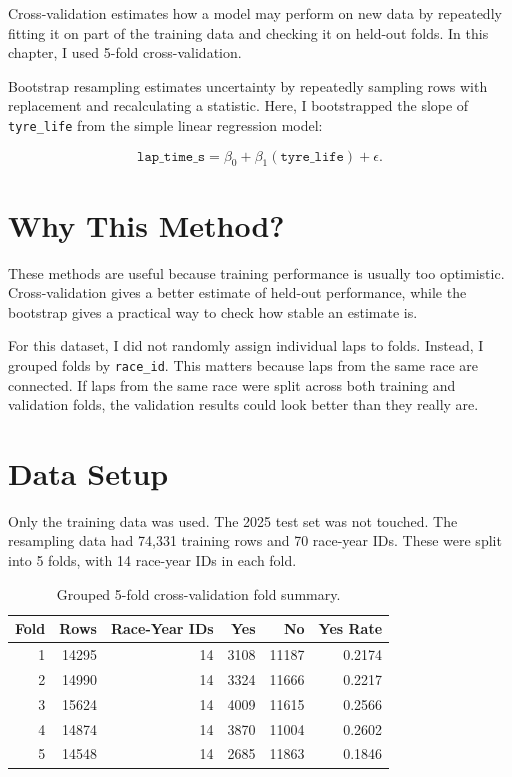 \documentclass[11pt,oneside,openany]{book}
\begin{document}
Cross-validation estimates how a model may perform on new data by repeatedly fitting it on part of the training data and checking it on held-out folds. In this chapter, I used 5-fold cross-validation.

Bootstrap resampling estimates uncertainty by repeatedly sampling rows with replacement and recalculating a statistic. Here, I bootstrapped the slope of \texttt{tyre\_life} from the simple linear regression model:

\[
\texttt{lap\_time\_s} = \beta_0 + \beta_1(\texttt{tyre\_life}) + \epsilon.
\]

\section{Why This Method?}

These methods are useful because training performance is usually too optimistic. Cross-validation gives a better estimate of held-out performance, while the bootstrap gives a practical way to check how stable an estimate is.

For this dataset, I did not randomly assign individual laps to folds. Instead, I grouped folds by \texttt{race\_id}. This matters because laps from the same race are connected. If laps from the same race were split across both training and validation folds, the validation results could look better than they really are.

\section{Data Setup}

Only the training data was used. The 2025 test set was not touched. The resampling data had 74,331 training rows and 70 race-year IDs. These were split into 5 folds, with 14 race-year IDs in each fold.

\begin{table}[H]
\centering
\small
\caption{Grouped 5-fold cross-validation fold summary.}
\begin{tabular}{rrrrrr}
\toprule
Fold & Rows & Race-Year IDs & Yes & No & Yes Rate\\
\midrule
1 & 14295 & 14 & 3108 & 11187 & 0.2174\\
2 & 14990 & 14 & 3324 & 11666 & 0.2217\\
3 & 15624 & 14 & 4009 & 11615 & 0.2566\\
4 & 14874 & 14 & 3870 & 11004 & 0.2602\\
5 & 14548 & 14 & 2685 & 11863 & 0.1846\\
\bottomrule
\end{tabular}
\end{table}
\end{document}
